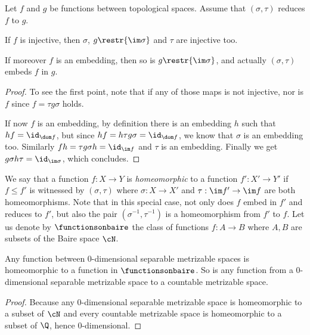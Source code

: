 \begin{proposition}\label{ContRedonEmbed}
Let $f$ and $g$ be functions between topological spaces.
Assume that $(\sigma,\tau)$ reduces $f$ to $g$.

If $f$ is injective, then $\sigma$, $g\restr{\im \sigma}$ and $\tau$ are injective too.

If moreover $f$ is an embedding, then so is $g\restr{\im \sigma}$, and actually $(\sigma,\tau)$ embeds $f$ in $g$.
\end{proposition}

\begin{proof}
To see the first point, note that if any of those maps is not injective, nor is $f$ since $f=\tau g \sigma$ holds.

If now $f$ is an embedding, by definition there is an embedding $h$ such that $hf=\id_{\dom f}$, but since $hf= h\tau g\sigma=\id_{\dom f}$, we know that $\sigma$ is an embedding too.
Similarly $fh=\tau g\sigma h=\id_{\im f }$ and $\tau$ is an embedding. Finally we get $g\sigma h\tau=\id_{\im \sigma}$, which concludes.
\end{proof}



We say that a function $f:X\to Y$ is \emph{homeomorphic} to a function $f':X'\to Y'$ if $f\leq f'$ is witnessed by $(\sigma,\tau)$ where $\sigma:X\to X'$ and $\tau:\im f'\to \im f$ are both homeomorphisms.
Note that in this special case, not only does $f$ embed in $f'$ and reduces to $f'$, but also the pair $(\sigma^{-1},\tau^{-1})$ is a homeomorphism from $f'$ to $f$. Let us denote by $\functionsonbaire$ the class of functions $f:A\to B$ where $A,B$ are subsets of the Baire space $\cN$.

\begin{proposition}\label{RepresentationforFunctions}
Any function between $0$-dimensional separable metrizable spaces is homeomorphic to a function in $\functionsonbaire$. 
So is any function from a $0$-dimensional separable metrizable space to a countable metrizable space. 
\end{proposition}

\begin{proof}
Because any $0$-dimen\-sional separable metrizable space is homeomorphic to a subset of $\cN$ and every countable metrizable space is homeomorphic to a subset of $\Q$, hence $0$-dimensional.
\end{proof}



